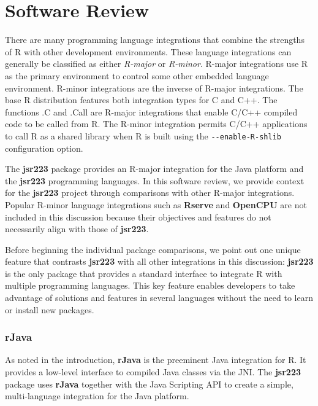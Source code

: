 
\chapter{Software Review}

There are many programming language integrations that combine the strengths of R with other development environments. These language integrations can generally be classified as either \textit{R-major} or \textit{R-minor}. R-major integrations use R as the primary environment to control some other embedded language environment. R-minor integrations are the inverse of R-major integrations. The base R distribution features both integration types for C and C++. The functions .C and .Call are R-major integrations that enable C/C++ compiled code to be called from R. The R-minor integration permits C/C++ applications to call R as a shared library when R is built using the \texttt{-{}-enable-R-shlib} configuration option.

The \textbf{jsr223} package provides an R-major integration for the Java platform and the \textbf{jsr223} programming languages. In this software review, we provide context for the \textbf{jsr223} project through comparisons with other R-major integrations. Popular R-minor language integrations such as \textbf{Rserve} \citep{rserve} and \textbf{OpenCPU} \citep{opencpu} are not included in this discussion because their objectives and features do not necessarily align with those of \textbf{jsr223}.

Before beginning the individual package comparisons, we point out one unique feature that contrasts \textbf{jsr223} with all other integrations in this discussion: \textbf{jsr223} is the only package that provides a standard interface to integrate R with multiple programming languages. This key feature enables developers to take advantage of solutions and features in several languages without the need to learn or install new packages.

\subsection{\textbf{rJava}}

As noted in the introduction, \textbf{rJava} is the preeminent Java integration for R. It provides a low-level interface to compiled Java classes via the JNI. The \textbf{jsr223} package uses \textbf{rJava} together with the Java Scripting API to create a simple, multi-language integration for the Java platform.

